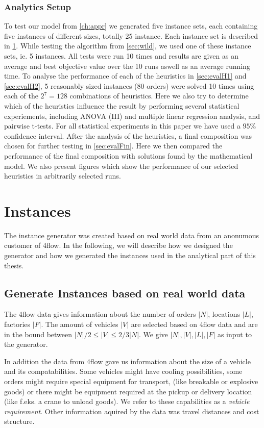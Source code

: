 \documentclass[../main.tex]{subfiles}
\begin{document}
\subsubsection{Analytics Setup}
To test our model from \ref{ch:appr} we generated five instance sets, each containing five instances of different sizes, totally 25 instance. 
Each instance set is described in \cref{sec:ins}.
While testing the algorithm from \cref{sec:wild}, we used one of these instance sets, ie. 5 instances. 
All tests were run 10 times and results are given as an average and best objective value over the 10 runs aswell as an average running time.
To analyse the performance of each of the heuristics in \cref{sec:evalH1} and \cref{sec:evalH2}, 5 reasonably sized instances (80 orders) were solved 10 times using each of the $2^7 = 128$ combinations of heuristics.
Here we also try to determine which of the heuristics influence the result by performing several statistical experiements, including ANOVA (III) and multiple linear regression analysis, and pairwise t-tests.
For all statistical experiments in this paper we have used a $95\%$ confidence interval.
After the analysis of the heuristics, a final composition was chosen for further testing in \cref{sec:evalFin}.
Here we then compared the performance of the final composition with solutions found by the mathematical model. 
We also present figures which show the performance of our selected heuristics in arbitrarily selected runs.

\section{Instances}
\label{sec:ins}
The instance generator was created based on real world data from an anonumous customer of 4flow. 
In the following, we will describe how we designed the generator and how we generated the instances used in the analytical part of this thesis.

\subsection{Generate Instances based on real world data}
\label{sec:data}
The 4flow data gives information about the number of orders $|N|$, locations $|L|$, factories $|F|$. 
The amount of vehicles $|V|$ are selected based on 4flow data and are in the bound between $|N|/2 \leq |V| \leq 2/3 |N|$.
We give $|N|, |V|, |L|, |F|$ as input to the generator.\par
In addition the data from 4flow gave us information about the size of a vehicle and its compatabilities. 
Some vehicles might have cooling possibilities, some orders might require special equipment for transport, (like breakable or explosive goods) or there might be equipment required at the pickup or delivery location (like f.eks. a crane to unload goods).
We refer to these capabilities as a \emph{vehicle requirement}.
Other information aquired by the data was travel distances and cost structure.
\end{document}
